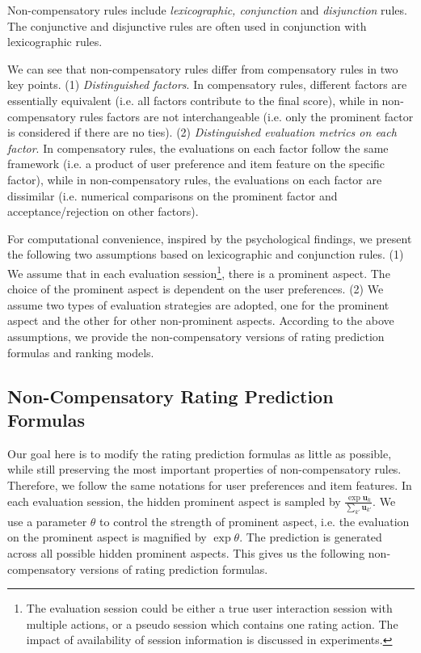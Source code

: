 \documentclass[letterpaper]{article} %
\begin{document}
Non-compensatory rules include \textit{lexicographic, conjunction} and \textit{disjunction} rules. The conjunctive and disjunctive rules are often used in conjunction with lexicographic rules.



We can see that non-compensatory rules differ from compensatory rules in two key points. (1) \textit{Distinguished factors}. In compensatory rules, different factors are essentially equivalent (i.e. all factors contribute to the final score), while in non-compensatory rules factors are not interchangeable (i.e. only the prominent factor is considered if there are no ties). (2) \textit{Distinguished evaluation metrics on each factor}. In compensatory rules, the evaluations on each factor follow the same framework (i.e. a product of user preference and item feature on the specific factor), while in non-compensatory rules, the evaluations on each factor are dissimilar (i.e. numerical comparisons on the prominent factor and acceptance/rejection on other factors).  

For computational convenience, inspired by the psychological findings, we present the following two assumptions based on lexicographic and conjunction rules. (1) We assume that in each evaluation session\footnote{The evaluation session could be either a true user interaction session with multiple actions, or a pseudo session which contains one rating action. The impact of availability of session information is discussed in experiments. }, there is a prominent aspect. The choice of the prominent aspect is dependent on the user preferences. (2) We assume two types of evaluation strategies are adopted, one for the prominent aspect and the other for other non-prominent aspects. According to the above assumptions, we provide the non-compensatory versions of rating prediction formulas and ranking models.

 
\subsection{Non-Compensatory Rating Prediction Formulas}
Our goal here is to modify the rating prediction formulas as little as possible, while still preserving the most important properties of non-compensatory rules. Therefore, we follow the same notations for user preferences and item features. In each evaluation session, the hidden prominent aspect is sampled by $\frac{\exp \mathbf{u}_k}{\sum_{k'} \mathbf{u}_{k'}} $. We use a parameter $\theta$ to control the strength of prominent aspect, i.e. the evaluation on the prominent aspect is magnified by  $\exp \theta$. The prediction is generated across all possible hidden prominent aspects. This gives us the following non-compensatory versions of rating prediction formulas.
\end{document}

